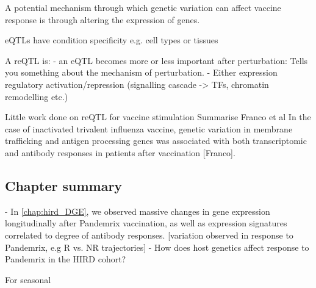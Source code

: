 A potential mechanism through which genetic variation can affect vaccine response is through altering the expression of genes.

eQTLs have condition specificity
e.g. cell types or tissues

A reQTL is: \autocite{vandiedonck2017GeneticAssociationMolecular}
- an eQTL becomes more or less important after perturbation: Tells you something about the mechanism of perturbation.
- Either expression regulatory activation/repression (signalling cascade -> TFs, chromatin remodelling etc.)

Little work done on reQTL for vaccine stimulation
Summarise Franco et al
In the case of inactivated trivalent influenza vaccine, genetic variation in membrane trafficking and antigen processing genes was associated with both transcriptomic and antibody responses in patients after vaccination [Franco].

\subsection{Chapter summary}


- In \autoref{chap:hird_DGE}, we observed massive changes in gene expression longitudinally after Pandemrix vaccination, as well as expression signatures correlated to degree of antibody responses.
[variation observed in response to Pandemrix, e.g R vs. NR trajectories]
- How does host genetics affect response to Pandemrix in the HIRD cohort?



For seasonal
%

